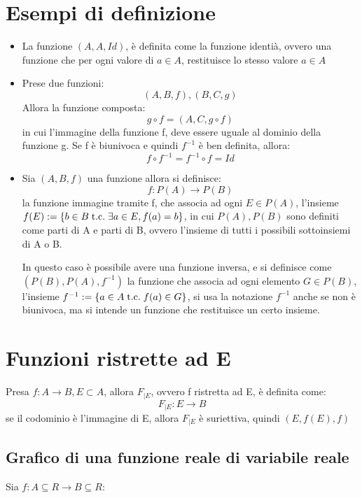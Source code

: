 \documentclass[a4paper, 12pt, openany]{book}
\begin{document}
	 \section{Esempi di definizione}
	 \begin{itemize}
	 	\item La funzione $(A, A, Id)$, è definita come la funzione identià, ovvero una funzione che per ogni valore di $a \in A$, restituisce lo stesso valore $a \in A$
	 	\item Prese due funzioni:
	 	\[(A, B, f), (B, C, g)\]
	 	Allora la funzione composta:
	 	\[g \circ f = (A, C, g \circ f)\]
	 	in cui l'immagine della funzione f, deve essere uguale al dominio della funzione g.
	 	Se f è biunivoca e quindi $f^{-1}$ è ben definita, allora:
	 	\[f \circ f^{-1} = f^{-1} \circ f = Id\]
	 	\item Sia $(A, B, f)$ una funzione allora si definisce:
	 	\[f: P(A) \longrightarrow P(B)\]
	 	la funzione immagine tramite f, che associa ad ogni $E \in P(A)$, l'insieme $f(E) := \{b \in B \;\text{t.c.}\; \exists a \in E, f(a) = b\}$, in cui $P(A), P(B)$ sono definiti come parti di A e parti di B, ovvero l'insieme di tutti i possibili sottoinsiemi di A o B.
	 	
	 	In questo caso è possibile avere una funzione inversa, e si definisce come $(P(B), P(A), f^{-1})$ la funzione che associa ad ogni elemento $G \in P(B)$, l'insieme $f^{-1} := \{a \in A \;\text{t.c.}\; f(a) \in G\}$, si usa la notazione $f^{-1}$ anche se non è biunivoca, ma si intende un funzione che restituisce un certo insieme.
	 \end{itemize}
	 
	 \section{Funzioni ristrette ad E}
	 Presa $f : A \longrightarrow B, E \subset A$, allora $F_{|E}$, ovvero f ristretta ad E, è definita come:
	 \[F_{|E} : E \longrightarrow B\]
	 se il codominio è l'immagine di E, allora $F_{|E}$ è 
	 suriettiva, quindi $(E, f(E), f)$
	 \subsection{Grafico di una funzione reale di variabile reale}
	 Sia $f: A \subseteq R \longrightarrow B \subseteq R$:
	 
\end{document}
